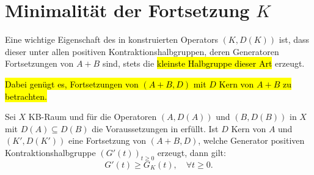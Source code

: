 

\section{Minimalität der Fortsetzung $K$}

\par
Eine wichtige Eigenschaft des in  konstruierten Operators $(K, D(K))$ ist, dass dieser unter allen positiven Kontraktionshalbgruppen, deren Generatoren Fortsetzungen von $A+B$ sind, stets die \hl{kleinste Halbgruppe dieser Art} erzeugt. 

\par
\hl{Dabei genügt es, Fortsetzungen von $(A+B, D)$ mit $D$ Kern von $A+B$ zu betrachten.}

\begin{fsatz}\cite{banasiak_arlotti_2006}\label{Minimalität von K}
Sei $X$ KB-Raum und für die Operatoren $(A, D(A))$ und $(B, D(B))$ in $X$ mit $D(A)\subseteq D(B)$ die Voraussetzungen in  erfüllt. Ist $D$ Kern von $A$ und $(K', D(K'))$ eine Fortsetzung von $(A+B, D)$, welche Generator positiven Kontraktionshalbgruppe $(G'(t))_{t\geq0}$ erzeugt, dann gilt:
\begin{equation*}
G'(t)\geq G_K(t),\quad \forall t\geq0.
\end{equation*}
\end{fsatz}

